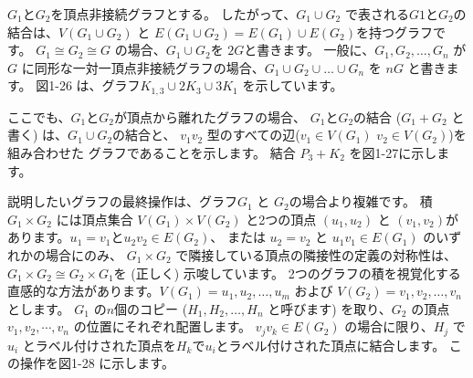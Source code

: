 
$G_1$と$G_2$を頂点非接続グラフとする。
したがって、$G_1\cup G_2$ で表される$G1$と$G_2$の結合は、$V(G_1 \cup G_2)$ と $E(G_1 \cup G_2) = E(G_1) \cup E(G_2)$を持つグラフです。
$G_1 \cong G_2 \cong G$ の場合、$G_1 \cup G_2$を
$2G$と書きます。 一般に、$G_1, G_2, \dots ,G_n$ が $G$ に同形な一対一頂点非接続グラフの場合、$G_1 \cup G_2 \cup \dots \cup G_n$ を $nG$ と書きます。
図1-26 は、グラフ$K_{1, 3} \cup 2K_3 \cup 3K_1$ を示しています。

ここでも、$G_1$と$G_2$が頂点から離れたグラフの場合、
$G_1$と$G_2$の結合 ($G_1 + G_2$ と書く) は、$G_1 \cup G_2$の結合と、 $v_1v_2$ 型のすべての辺($v_1 \in V(G_1)$ $v_2 \in V(G_2)$)を組み合わせた
グラフであることを示します。 結合 $P_3 + K_2$ を図1-27に示します。

説明したいグラフの最終操作は、グラフ$G_1$ と $G_2$の場合より複雑です。
積$G_1 \times G_2$ には頂点集合 $V(G_1) \times V(G_2)$ と2つの頂点 $(u_1, u_2)$ と $(v_1, v_2)$があります。$u_1 = v_1$と$u_2v_2 \in E(G_2)$、
または $u_2 = v_2$ と $u_1v_1 \in E(G_1)$ のいずれかの場合にのみ、
$G_1 \times G_2$ で隣接している頂点の隣接性の定義の対称性は、
$G_1 \times G_2 \cong G_2 \times G_1$を (正しく) 示唆しています。
2つのグラフの積を視覚化する直感的な方法があります。$V(G_1) = {u_1, u_2, \dots, u_m}$
および $V(G_2) = {v_1, v_2, \dots, v_n}$ とします。 
$G_1$ の$n$個のコピー ($H_1, H_2, \dots, H_n$ と呼びます) を取り、$G_2$ の頂点 $v_1, v_2, \cdots, v_n$ の位置にそれぞれ配置します。
$v_jv_k \in E(G_2)$ の場合に限り、$H_j$ で $u_i$ とラベル付けされた頂点を$H_k$で$u_i$とラベル付けされた頂点に結合します。
この操作を図1-28 に示します。